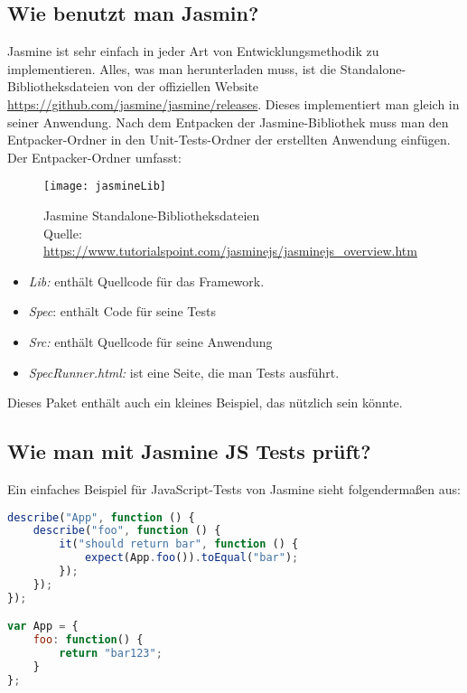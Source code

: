 \subsection{Wie benutzt man Jasmin?}
Jasmine ist sehr einfach in jeder Art von Entwicklungsmethodik zu implementieren. Alles, was man herunterladen muss, ist die Standalone-Bibliotheksdateien von der offiziellen Website \url{https://github.com/jasmine/jasmine/releases}. Dieses implementiert man gleich in seiner Anwendung. Nach dem Entpacken der Jasmine-Bibliothek muss man den Entpacker-Ordner in den Unit-Tests-Ordner der erstellten Anwendung einfügen. Der Entpacker-Ordner umfasst:
\begin{figure}[ !h] \centering
\texttt{[image: jasmineLib]}
\caption[Jasmine-Bibliotheksdateien]{Jasmine Standalone-Bibliotheksdateien\\ Quelle: \url{https://www.tutorialspoint.com/jasminejs/jasminejs_overview.htm}}\label{fig:jasmineLib}
\end{figure}
\begin{itemize}
\item	\textit{Lib:} enthält Quellcode für das Framework.
\item	\textit{Spec}: enthält Code für seine Tests
\item	\textit{Src:} enthält Quellcode für seine Anwendung
\item 	\textit{SpecRunner.html:} ist eine Seite, die man Tests ausführt.
\end{itemize}
Dieses Paket enthält auch ein kleines Beispiel, das nützlich sein könnte.

\subsection{Wie man mit Jasmine JS Tests prüft?}
Ein einfaches Beispiel für JavaScript-Tests von Jasmine sieht folgendermaßen aus:
\begin{lstlisting}[language=JavaScript,basicstyle=\scriptsize]
describe("App", function () {
    describe("foo", function () {
        it("should return bar", function () {
            expect(App.foo()).toEqual("bar");
        });
    });
});

var App = {
    foo: function() {
        return "bar123";
    }
};
\end{lstlisting}

